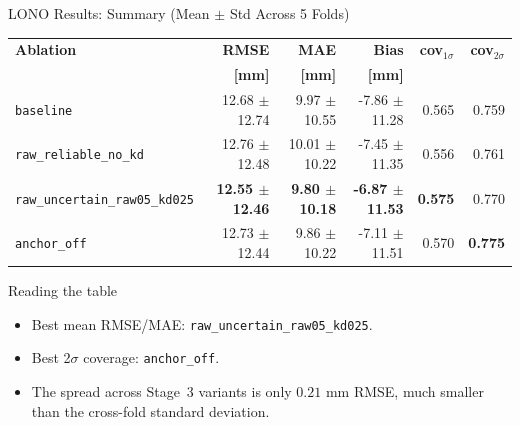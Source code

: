 \documentclass[UTF8,aspectratio=169]{ctexbeamer}
\newcommand{\good}[1]{\textcolor{green!45!black}{#1}}
\newcommand{\bluenote}[1]{\textcolor{blue!65!black}{#1}}
\begin{document}
\begin{frame}{LONO Results: Summary (Mean \(\pm\) Std Across 5 Folds)}
\small
\begin{center}
\renewcommand{\arraystretch}{1.18}
\setlength{\tabcolsep}{3.5pt}
\begin{tabular}{@{}lrrrrr@{}}
\toprule
\textbf{Ablation} & \textbf{RMSE} & \textbf{MAE} & \textbf{Bias} & \textbf{cov$_{1\sigma}$} & \textbf{cov$_{2\sigma}$} \\
 & \textbf{[mm]} & \textbf{[mm]} & \textbf{[mm]} & & \\
\midrule
\texttt{baseline} & 12.68 \(\pm\) 12.74 & 9.97 \(\pm\) 10.55 & -7.86 \(\pm\) 11.28 & 0.565 & 0.759 \\
\texttt{raw\_reliable\_no\_kd} & 12.76 \(\pm\) 12.48 & 10.01 \(\pm\) 10.22 & -7.45 \(\pm\) 11.35 & 0.556 & 0.761 \\
\rowcolor{winrow}
\texttt{raw\_uncertain\_raw05\_kd025} & \textbf{12.55 \(\pm\) 12.46} & \textbf{9.80 \(\pm\) 10.18} & \textbf{-6.87 \(\pm\) 11.53} & \textbf{0.575} & 0.770 \\
\rowcolor{softrow}
\texttt{anchor\_off} & 12.73 \(\pm\) 12.44 & 9.86 \(\pm\) 10.22 & -7.11 \(\pm\) 11.51 & 0.570 & \textbf{0.775} \\
\bottomrule
\end{tabular}
\end{center}

\vspace{0.5em}
\begin{block}{Reading the table}
\begin{itemize}\setlength\itemsep{2pt}
  \item Best mean RMSE/MAE: \good{\texttt{raw\_uncertain\_raw05\_kd025}}.
  \item Best 2\(\sigma\) coverage: \bluenote{\texttt{anchor\_off}}.
  \item The spread across Stage~3 variants is only \(0.21\) mm RMSE, much smaller than the cross-fold standard deviation.
\end{itemize}
\end{block}
\end{frame}
\end{document}
